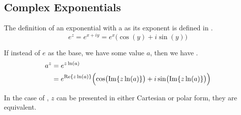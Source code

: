 \subsection{Complex Exponentials}\label{subsec:Complex_Exponentials}
The definition of an exponential with a  as its exponent is defined in .
\begin{equation}\label{eq:Complex_Exponential}
  e^{z} = e^{x + iy} = e^{x} \bigl( \cos(y) + i \sin(y) \bigr)
\end{equation}

If instead of $e$ as the base, we have some value $a$, then we have .
\begin{equation}\label{eq:Complex_Exponential_Diff_Base}
  \begin{aligned}
    a^{z} &= e^{z \ln(a)} \\
    &= e^{\operatorname{Re} \lbrace z \ln(a) \rbrace} \Bigl( \cos \bigl(\operatorname{Im} \lbrace z \ln(a) \rbrace \bigr) + i \sin \bigl(\operatorname{Im} \lbrace z \ln(a) \rbrace \bigl) \Bigr)
  \end{aligned}
\end{equation}

In the case of , $z$ can be presented in either Cartesian or polar form, they are equivalent.

